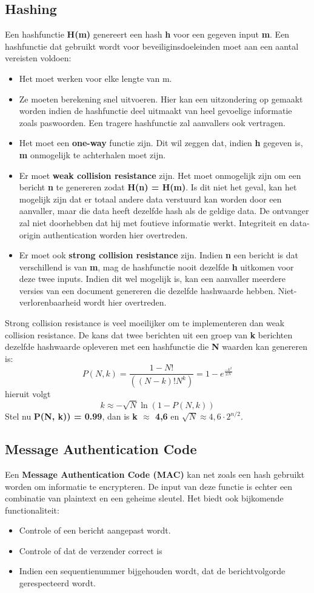 	\subsection{Hashing}
	Een hashfunctie \textbf{H(m)} genereert een hash \textbf{h} voor een gegeven input \textbf{m}. Een hashfunctie dat gebruikt wordt voor beveiliginsdoeleinden moet aan een aantal vereisten voldoen:
	\begin{itemize}
		\item Het moet werken voor elke lengte van m.
		\item Ze moeten berekening snel uitvoeren. Hier kan een uitzondering op gemaakt worden indien de hashfunctie deel uitmaakt van heel gevoelige informatie zoals paswoorden. Een tragere hashfunctie zal aanvallers ook vertragen.
		\item Het moet een \textbf{one-way} functie zijn. Dit wil zeggen dat, indien \textbf{h} gegeven is, \textbf{m} onmogelijk te achterhalen moet zijn.
		\item Er moet \textbf{weak collision resistance} zijn. Het moet onmogelijk zijn om een bericht \textbf{n} te genereren zodat \textbf{H(n) = H(m)}. Is dit niet het geval, kan het mogelijk zijn dat er totaal andere data verstuurd kan worden door een aanvaller, maar die data heeft dezelfde hash als de geldige data. De ontvanger zal niet doorhebben dat hij met foutieve informatie werkt. Integriteit en data-origin authentication worden hier overtreden.
		\item Er moet ook \textbf{strong collision resistance} zijn. Indien \textbf{n} een bericht is dat verschillend is van \textbf{m}, mag de hashfunctie nooit dezelfde \textbf{h} uitkomen voor deze twee inputs. Indien dit wel mogelijk is, kan een aanvaller meerdere versies van een document genereren die dezelfde hashwaarde hebben. Niet-verlorenbaarheid wordt hier overtreden.
	\end{itemize}
	Strong collision resistance is veel moeilijker om te implementeren dan weak collision resistance. De kans dat twee berichten uit een groep van \textbf{k} berichten dezelfde hashwaarde opleveren met een hashfunctie die \textbf{N} waarden kan genereren is: 
	$$P(N, k) = \frac{1 - N!}{((N - k)! N^k)} = 1 - e^{\frac{-k^2}{2N}}$$
	hieruit volgt 
	$$k \approx -\sqrt{N} \ln(1 - P(N, k))$$
	Stel nu \textbf{P(N, k)) = 0.99}, dan is \textbf{k $\approx$ 4,6} en \textbf{$\sqrt{N} \approx 4,6 \cdot 2^{n/2}$}.
	\subsection{Message Authentication Code}
	Een \textbf{Message Authentication Code (MAC)} kan net zoals een hash gebruikt worden om informatie te encrypteren. De input van deze functie is echter een combinatie van plaintext en een geheime sleutel. Het biedt ook bijkomende functionaliteit:
	\begin{itemize}
		\item Controle of een bericht aangepast wordt.
		\item Controle of dat de verzender correct is
		\item Indien een sequentienummer bijgehouden wordt, dat de berichtvolgorde gerespecteerd wordt.
	\end{itemize}

